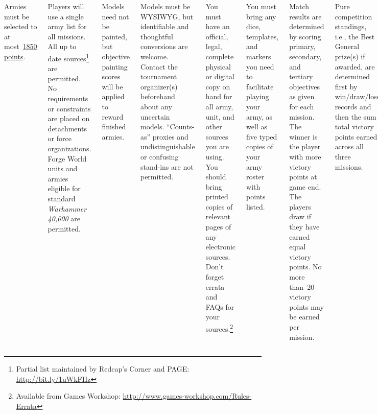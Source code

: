 \documentclass{40k}
\begin{document}

\begin{columns}


Armies must be selected to at most~\underline{1850 points}.

Players will use a single army list for all missions.  All up to date
sources\footnote{Partial list maintained by Redcap's Corner and PAGE:
  \url{http://bit.ly/1uWkFHz}} are permitted.  No requirements or
constraints are placed on detachments or force organizations.  Forge
World units and armies eligible for standard \emph{Warhammer 40,000}
are permitted.

Models need not be painted, but objective painting scores will be
applied to reward finished armies.

Models must be WYSIWYG, but identifiable and thoughtful conversions
are welcome.  Contact the tournament organizer(s) beforehand about any
uncertain models.  ``Counts-as'' proxies and undistinguishable or
confusing stand-ins are not permitted.


You must have an official, legal, complete physical or digital copy on
hand for all army, unit, and other sources you are using.  You should
bring printed copies of relevant pages of any electronic sources.
Don't forget errata and FAQs for your sources.\footnote{Available from
  Games Workshop:
  \url{http://www.games-workshop.com/Rules-Errata}}

You must bring any dice, templates, and markers you need to facilitate
playing your army, as well as five typed copies of your army roster
with points listed.


%

Match results are determined by scoring primary, secondary, and
tertiary objectives as given for each mission.  The winner is the
player with more victory points at game end.  The players draw if they
have earned equal victory points.  No more than~20 victory points may
be earned per mission.

Pure competition standings, i.e., the Best General prize(s) if
awarded, are determined first by win/draw/loss records and then the
sum total victory points earned across all three missions.


\end{columns}
\end{document}

